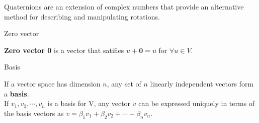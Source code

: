 \documentclass[10pt,a4paper]{article}
\begin{document}
\begin{enumerate}
			Quaternions are an extension of complex numbers that provide an alternative method for describing and manipulating rotations.\\
			
		{\large \item Zero vector}
			
			\textbf{Zero vector 0} is a vector that satifies $ u + \textbf{0} = u $ for $ \forall u \in V $.\\	
		
		{\large \item Basis}
	
			If a vector space has dimension $ n $, any set of $ n $ linearly independent vectors form a \textbf{basis}. \\
			If $ v_1, v_2, \cdots, v_n $ is a basis for V, any vector $ v $ can be expressed uniquely in terms of the basis vectors as $ v = \beta_1 v_1 + \beta_2 v_2 + \cdots + \beta_n v_n $.
	\end{enumerate}
\end{document}
